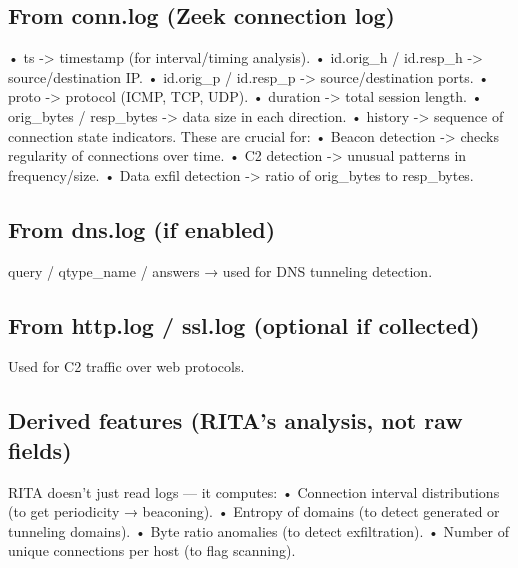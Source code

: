 \subsection{From conn.log (Zeek connection log)}
    • ts -> timestamp (for interval/timing analysis).
    • id.orig\_h / id.resp\_h -> source/destination IP.
    • id.orig\_p / id.resp\_p -> source/destination ports.
    • proto -> protocol (ICMP, TCP, UDP).
    • duration -> total session length.
    • orig\_bytes / resp\_bytes -> data size in each direction.
    • history -> sequence of connection state indicators.
These are crucial for:
    • Beacon detection -> checks regularity of connections over time.
    • C2 detection -> unusual patterns in frequency/size.
    • Data exfil detection -> ratio of orig\_bytes to resp\_bytes. 

\subsection{From dns.log (if enabled)}
query / qtype\_name / answers → used for DNS tunneling detection.

\subsection{From http.log / ssl.log (optional if collected)}
Used for C2 traffic over web protocols. 


\subsection{Derived features (RITA’s analysis, not raw fields)}
RITA doesn’t just read logs — it computes:
    • Connection interval distributions (to get periodicity → beaconing).
    • Entropy of domains (to detect generated or tunneling domains).
    • Byte ratio anomalies (to detect exfiltration).
    • Number of unique connections per host (to flag scanning).



